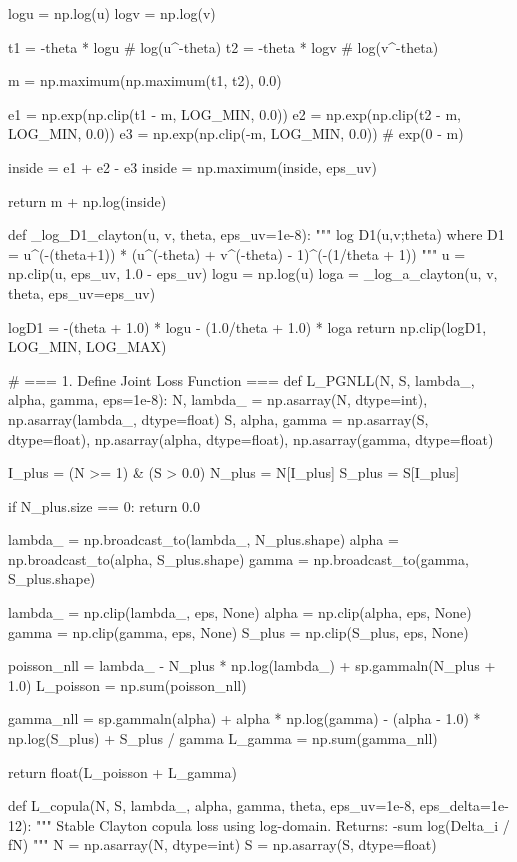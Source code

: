    logu = np.log(u)
    logv = np.log(v)

    t1 = -theta * logu  # log(u^-theta)
    t2 = -theta * logv  # log(v^-theta)

    m = np.maximum(np.maximum(t1, t2), 0.0)

    e1 = np.exp(np.clip(t1 - m, LOG_MIN, 0.0))
    e2 = np.exp(np.clip(t2 - m, LOG_MIN, 0.0))
    e3 = np.exp(np.clip(-m,  LOG_MIN, 0.0))  # exp(0 - m)

    inside = e1 + e2 - e3
    inside = np.maximum(inside, eps_uv)

    return m + np.log(inside)


def _log_D1_clayton(u, v, theta, eps_uv=1e-8):
    """
    log D1(u,v;theta) where
    D1 = u^(-(theta+1)) * (u^(-theta) + v^(-theta) - 1)^(-(1/theta + 1))
    """
    u = np.clip(u, eps_uv, 1.0 - eps_uv)
    logu = np.log(u)
    loga = _log_a_clayton(u, v, theta, eps_uv=eps_uv)

    logD1 = -(theta + 1.0) * logu - (1.0/theta + 1.0) * loga
    return np.clip(logD1, LOG_MIN, LOG_MAX)


# === 1. Define Joint Loss Function ===
def L_PGNLL(N, S, lambda_, alpha, gamma, eps=1e-8):
    N, lambda_      = np.asarray(N, dtype=int), np.asarray(lambda_, dtype=float)
    S, alpha, gamma = np.asarray(S, dtype=float), np.asarray(alpha, dtype=float), np.asarray(gamma, dtype=float)

    I_plus = (N >= 1) & (S > 0.0)
    N_plus = N[I_plus]
    S_plus = S[I_plus]

    if N_plus.size == 0:
        return 0.0

    lambda_ = np.broadcast_to(lambda_, N_plus.shape)
    alpha   = np.broadcast_to(alpha, S_plus.shape)
    gamma   = np.broadcast_to(gamma, S_plus.shape)

    lambda_ = np.clip(lambda_, eps, None)
    alpha   = np.clip(alpha, eps, None)
    gamma   = np.clip(gamma, eps, None)
    S_plus  = np.clip(S_plus, eps, None)

    poisson_nll = lambda_ - N_plus * np.log(lambda_) + sp.gammaln(N_plus + 1.0)
    L_poisson = np.sum(poisson_nll)

    gamma_nll = sp.gammaln(alpha) + alpha * np.log(gamma) - (alpha - 1.0) * np.log(S_plus) + S_plus / gamma
    L_gamma = np.sum(gamma_nll)

    return float(L_poisson + L_gamma)


def L_copula(N, S, lambda_, alpha, gamma, theta, eps_uv=1e-8, eps_delta=1e-12):
    """
    Stable Clayton copula loss using log-domain.
    Returns: -sum log(Delta_i / fN)
    """
    N = np.asarray(N, dtype=int)
    S = np.asarray(S, dtype=float)

